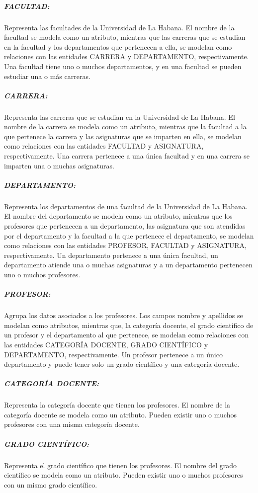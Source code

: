 \subparagraph{FACULTAD:}
Representa las facultades de la Universidad de La Habana.
El nombre de la facultad se modela como un atributo, mientras que 
las carreras que se estudian en la facultad y los departamentos que pertenecen 
a ella, se modelan como relaciones con las entidades CARRERA y DEPARTAMENTO, respectivamente.
Una facultad tiene uno o muchos departamentos, y en 
una facultad se pueden estudiar una o más carreras.

\subparagraph{CARRERA:}
Representa las carreras que se estudian en la Universidad de La Habana.
El nombre de la carrera se modela como un atributo, mientras que la facultad a la que pertenece la carrera y
las asignaturas que se imparten en ella, se modelan como relaciones con las entidades FACULTAD y
ASIGNATURA, respectivamente. 
Una carrera pertenece a una única facultad y en una carrera se imparten una o muchas asignaturas.

\subparagraph{DEPARTAMENTO:}
Representa los departamentos de una facultad de la Universidad de La Habana.
El nombre del departamento se modela como un atributo, mientras que los profesores que 
pertenecen a un departamento, las asignatura que son atendidas por el departamento y la 
facultad a la que pertenece el departamento, se modelan como relaciones con las entidades 
PROFESOR, FACULTAD y ASIGNATURA, respectivamente. Un departamento pertenece a una única facultad,
un departamento atiende una o muchas asignaturas y a un departamento pertenecen uno o muchos 
profesores.

\subparagraph{PROFESOR:}
Agrupa los datos asociados a los profesores.
Los campos nombre y apellidos se modelan como atributos,  
mientras que, la categoría docente, el grado 
científico de un profesor y el departamento al que pertenece, se modelan como 
relaciones con las entidades CATEGORÍA DOCENTE, GRADO CIENTÍFICO y 
DEPARTAMENTO, respectivamente. Un profesor pertenece a un único departamento y puede tener solo 
un grado científico y una categoría docente. 


\subparagraph{CATEGORÍA DOCENTE:}
Representa la categoría docente que tienen los profesores.
El nombre de la categoría docente se modela como un atributo. 
Pueden existir uno o muchos profesores con una misma categoría docente.

\subparagraph{GRADO CIENTÍFICO:}
Representa el grado científico que tienen los profesores.
El nombre del grado científico se modela como un atributo.
Pueden existir uno o muchos profesores con un mismo grado científico.





